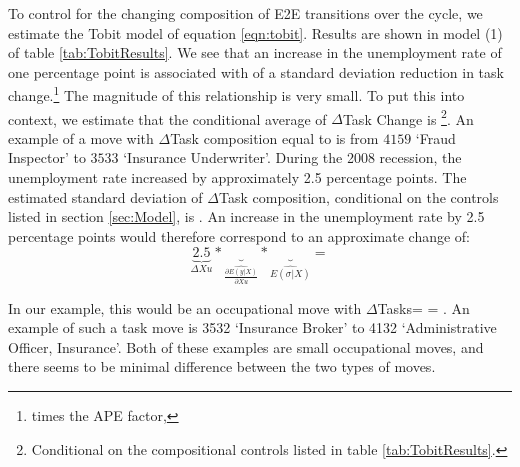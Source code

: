 \documentclass[preprint,12pt,authoryear]{elsarticle}
\begin{document}
To control for the changing composition of E2E transitions over the cycle, we estimate the Tobit model of equation \ref{eqn:tobit}. Results are shown in model (1) of table \ref{tab:TobitResults}. We see that an increase in the unemployment rate of one percentage point is associated with \hspace{-1mm} of a standard deviation reduction in task change.\footnote{\hspace{-1mm} times the APE factor, \hspace{-1mm}} The magnitude of this relationship is very small. To put this into context, we estimate that the conditional average of $\Delta$Task Change is \hspace{-1mm}\footnote{Conditional on the compositional controls listed in table \ref{tab:TobitResults}.}. An example of a move with $\Delta$Task composition equal to \hspace{-1mm}  is from $4159$ `Fraud Inspector' to $3533$ `Insurance Underwriter'. During the 2008 recession, the unemployment rate increased by approximately 2.5 percentage points. The estimated standard deviation of $\Delta$Task composition, conditional on the controls listed in section \ref{sec:Model}, is \hspace{-1mm}. An increase in the unemployment rate by 2.5 percentage points would therefore correspond to an approximate change of:
\[
\underbrace{2.5}_{\Delta Xu}* \underbrace{}_{\widehat{\frac{\partial E(y| X)}{\partial Xu}}} *\underbrace{}_{ \widehat{E(\sigma|X)}} = 
\]

\noindent In our example, this would be an occupational move with $\Delta$Tasks=\hspace{-1mm}  =  \hspace{-1.5mm}. An example of such a task move is 3532 `Insurance Broker' to 4132 `Administrative Officer, Insurance'. Both of these examples are small occupational moves, and there seems to be minimal difference between the two types of moves.

\vspace{2mm}
\end{document}
